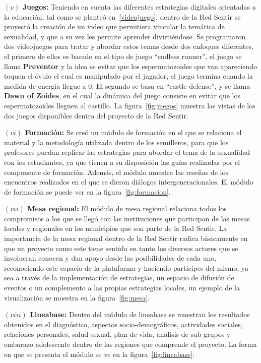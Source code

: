 \documentclass[journal,transmag]{IEEEtran}
\begin{document}
\textbf{$(v)$ Juegos:} Teniendo en cuenta las diferentes estrategias digitales orientadas a la educación, tal como se planteó en~\ref{videojuego}, dentro de la Red Sentir se proyectó la creación de un video que permitiera vincular la temática de sexualidad, y que a su vez les permite aprender divirtiéndose. Se programaron dos videojuegos para tratar y abordar estos temas desde dos enfoques diferentes, el primero de ellos es basado en el tipo de juego ``endless runner'', el juego se llama \textbf{Preventor} y la idea es evitar que los espermatozoides que van apareciendo toquen el óvulo el cual es manipulado por el jugador, el juego termina cuando la medida de energía llegue a $0$. El segundo se basa en ``castle defense'', y se llama \textbf{Dawn of Zoides}, en el cual la dinámica del juego consiste en evitar que los espermatozoides lleguen al castillo.  La figura~\ref{fig:juegos} muestra las vistas de los dos juegos disponibles dentro del proyecto de la Red Sentir.

\textbf{$(vi)$ Formación:} Se creó un módulo de formación en el que se relaciona el material y la metodología utilizada dentro de los semilleros, para que los profesores puedan replicar las estrategias para abordar el tema de la sexualidad con los estudiantes, ya que tienen a su disposición las guías realizadas por el componente de formación. Además, el módulo muestra las reseñas de los encuentros realizados en el que se dieron diálogos intergeneracionales. El módulo de formación se puede ver en la figura~\ref{fig:formacion}.

\textbf{$(vii)$ Mesa regional:} El módulo de mesa regional relaciona todos los compromisos a los que se llegó con las instituciones que participan de las mesas locales y regionales en los municipios que son parte de la Red Sentir. La importancia de la mesa regional dentro de la Red Sentir radica básicamente en que un proyecto como este tiene sentido en tanto los diversos actores que se involucran conocen y dan apoyo desde las posibilidades de cada uno, reconociendo este espacio de la plataforma y haciendo participes del mismo, ya sea a través de la implementación de estrategias, un espacio de difusión de eventos o un complemento a las propias estrategias locales, un ejemplo de la visualización se muestra en la figura~\ref{fig:mesa}.

\textbf{$(viii)$ Lineabase:} Dentro del módulo de lineabase se muestran los resultados obtenidos en el diagnóstico, aspectos socio-demográficos, actividades sociales, relaciones personales, salud sexual, plan de vida, análisis de sub-grupos y embarazo adolescente dentro de las regiones que comprende el proyecto. La forma en que se presenta el módulo se ve en la figura~\ref{fig:lineabase}.
\end{document}

